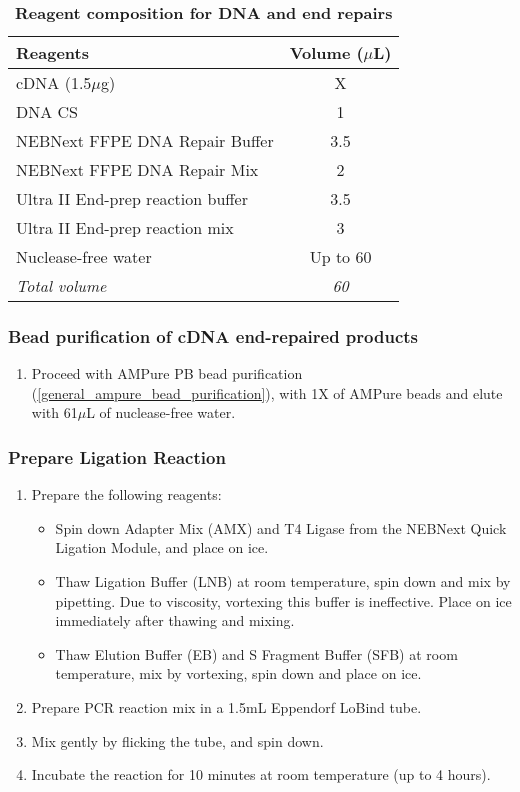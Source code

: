 \vspace{1cm}
\begin{table}[h]
	\centering
	\caption[Repair DNA and ends]%
	{\textbf{Reagent composition for DNA and end repairs}}
	\label{tab:ont_repair_dna_ends}
	\begin{tabularx}{0.8\textwidth}{lc}
		\toprule
		Reagents                          & Volume ($\mu$L) \\ \midrule
		cDNA (1.5$\mu$g)                  & X           \\
		DNA CS                            & 1           \\
		NEBNext FFPE DNA Repair Buffer    & 3.5         \\
		NEBNext FFPE DNA Repair Mix       & 2           \\
		Ultra II End-prep reaction buffer & 3.5         \\
		Ultra II End-prep reaction mix    & 3           \\
		Nuclease-free water               & Up to 60    \\
		\textit{Total volume}                             & \textit{60}          \\ \bottomrule
	\end{tabularx}
\end{table}

\subsubsection{Bead purification of cDNA end-repaired products}
\begin{enumerate}
	\item Proceed with AMPure PB bead purification (\cref{general_ampure_bead_purification}), with 1X of AMPure beads and elute with 61$\mu$L of nuclease-free water.
\end{enumerate}

\subsubsection{Prepare Ligation Reaction}
\begin{enumerate}
	\item Prepare the following reagents:
	\begin{itemize}
		\item Spin down Adapter Mix (AMX) and T4 Ligase from the NEBNext Quick Ligation Module, and place on ice.
		\item Thaw Ligation Buffer (LNB) at room temperature, spin down and mix by pipetting. Due to viscosity, vortexing this buffer is ineffective. Place on ice immediately after thawing and mixing.
		\item Thaw Elution Buffer (EB) and S Fragment Buffer (SFB) at room temperature, mix by vortexing, spin down and place on ice.
	\end{itemize}
	\item Prepare PCR reaction mix in a 1.5mL Eppendorf LoBind tube.
	\item Mix gently by flicking the tube, and spin down.
	\item Incubate the reaction for 10 minutes at room temperature (up to 4 hours).
\end{enumerate}

